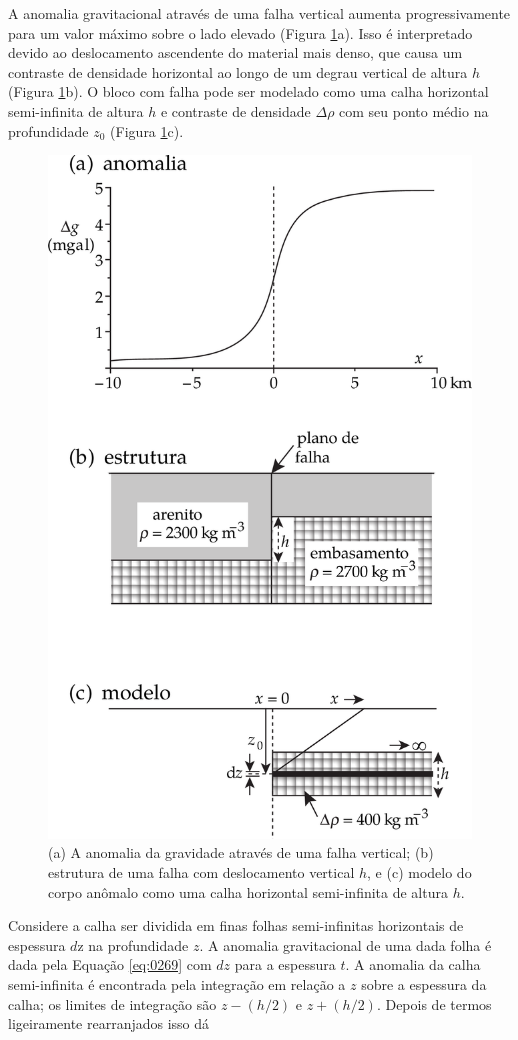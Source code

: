 \documentclass[]{book}
\theoremstyle{definition}
\theoremstyle{definition}
\theoremstyle{definition}
\theoremstyle{remark}
\begin{document}
A anomalia gravitacional através de uma falha vertical aumenta progressivamente para um valor máximo sobre o lado elevado (Figura \ref{fig:slab}a). Isso é interpretado devido ao deslocamento ascendente do material mais denso, que causa um contraste de densidade horizontal ao longo de um degrau vertical de altura \(h\) (Figura \ref{fig:slab}b). O bloco com falha pode ser modelado como uma calha horizontal semi-infinita de altura \(h\) e contraste de densidade \(\Delta\rho\) com seu ponto médio na profundidade \(z_0\) (Figura \ref{fig:slab}c).

\begin{figure}

{\centering \includegraphics[width=0.6\linewidth]{fig/Fig_02.47} 

}

\caption{(a) A anomalia da gravidade através de uma falha vertical; (b) estrutura de uma falha com deslocamento vertical $h$, e (c) modelo do corpo anômalo como uma calha horizontal semi-infinita de altura $h$.}\label{fig:slab}
\end{figure}

Considere a calha ser dividida em finas folhas semi-infinitas horizontais de espessura \(d\)z na profundidade \(z\). A anomalia gravitacional de uma dada folha é dada pela Equação \eqref{eq:0269} com \(dz\) para a espessura \(t\). A anomalia da calha semi-infinita é encontrada pela integração em relação a \(z\) sobre a espessura da calha; os limites de integração são \(z-(h/2)\) e \(z+(h/2)\). Depois de termos ligeiramente rearranjados isso dá
\end{document}
